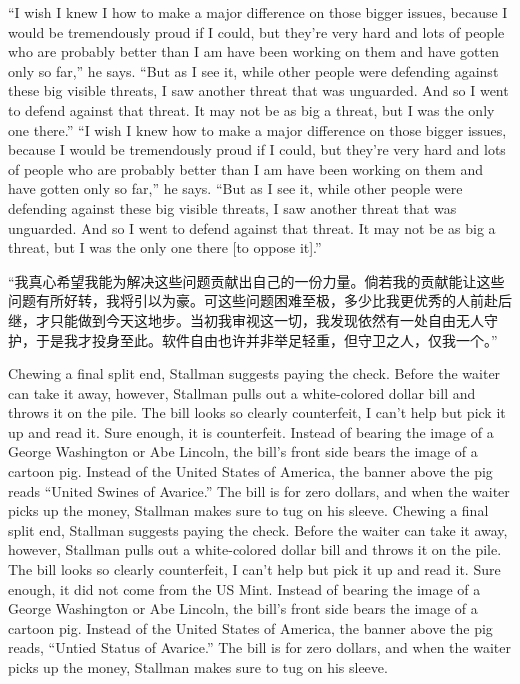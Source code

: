 \ifdefined\eng
\ifdefined\vone
``I wish I knew I how to make a major difference on those bigger issues, because I would be tremendously proud if I could, but they're very hard and lots of people who are probably better than I am have been working on them and have gotten only so far,'' he says. ``But as I see it, while other people were defending against these big visible threats, I saw another threat that was unguarded. And so I went to defend against that threat. It may not be as big a threat, but I was the only one there.''
\fi
\ifdefined\vtwo
``I wish I knew how to make a major difference on those bigger issues, because I would be tremendously proud if I could, but they're very hard and lots of people who are probably better than I am have been working on them and have gotten only so far,'' he says. ``But as I see it, while other people were defending against these big visible threats, I saw another threat that was unguarded. And so I went to defend against that threat. It may not be as big a threat, but I was the only one there [to oppose it].''
\fi
\fi

\ifdefined\chs
``我真心希望我能为解决这些问题贡献出自己的一份力量。倘若我的贡献能让这些问题有所好转，我将引以为豪。可这些问题困难至极，多少比我更优秀的人前赴后继，才只能做到今天这地步。当初我审视这一切，我发现依然有一处自由无人守护，于是我才投身至此。软件自由也许并非举足轻重，但守卫之人，仅我一个。''
\fi

\ifdefined\eng
\ifdefined\vone
Chewing a final split end, Stallman suggests paying the check. Before the waiter can take it away, however, Stallman pulls out a white-colored dollar bill and throws it on the pile. The bill looks so clearly counterfeit, I can't help but pick it up and read it. Sure enough, it is counterfeit. Instead of bearing the image of a George Washington or Abe Lincoln, the bill's front side bears the image of a cartoon pig. Instead of the United States of America, the banner above the pig reads ``United Swines of Avarice.'' The bill is for zero dollars, and when the waiter picks up the money, Stallman makes sure to tug on his sleeve.
\fi
\ifdefined\vtwo
Chewing a final split end, Stallman suggests paying the check. Before the waiter can take it away, however, Stallman pulls out a white-colored dollar bill and throws it on the pile. The bill looks so clearly counterfeit, I can't help but pick it up and read it. Sure enough, it did not come from the US Mint. Instead of bearing the image of a George Washington or Abe Lincoln, the bill's front side bears the image of a cartoon pig. Instead of the United States of America, the banner above the pig reads, ``Untied Status of Avarice.'' The bill is for zero dollars, and when the waiter picks up the money, Stallman makes sure to tug on his sleeve.
\fi
\fi

